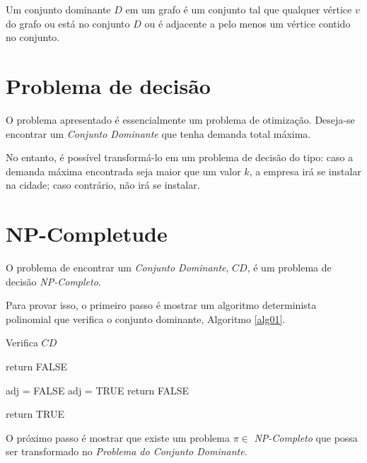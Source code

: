 \documentclass[10pt,a4paper]{article}
\begin{document}
	Um conjunto dominante $D$ em um grafo é um conjunto tal que qualquer vértice $v$ do grafo ou está no conjunto $D$ ou é adjacente a pelo menos um 
	vértice contido no conjunto.

	\section{Problema de decisão}

	O problema apresentado é essencialmente um problema de otimização. 
	Deseja-se encontrar um \emph{Conjunto Dominante} que tenha demanda total máxima.

	No entanto, é possível transformá-lo em um problema de decisão do tipo: caso a demanda máxima encontrada seja maior que um valor $k$, 
	a empresa irá se instalar na cidade; caso contrário, não irá se instalar.

    \section{NP-Completude}

    O problema de encontrar um \emph{Conjunto Dominante}, $CD$, é um problema de decisão \emph{NP-Completo}.

    Para provar isso, o primeiro passo é mostrar um algoritmo determinista polinomial que verifica o conjunto dominante, Algoritmo \ref{alg01}.

    \begin{algorithm}[H]
    	\caption{Verifica $CD$}
    	\label{alg01}

    	\begin{algorithmic}[1]
    		
    			\State return FALSE
    		\EndIf

    				\State adj = FALSE
    						\State adj = TRUE
						\EndIf
					\EndFor
    					\State return FALSE
					\EndIf
    			\EndIf
    		\EndFor

    		\State return TRUE

		\end{algorithmic}
        
    \end{algorithm}

    O próximo passo é mostrar que existe um problema $\pi \in $ \emph{NP-Completo} que possa ser transformado no \emph{Problema do Conjunto Dominante}.
\end{document}
